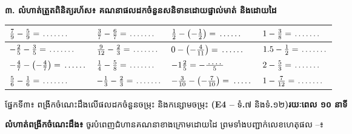\documentclass[a4paper,10pt]{article}
\newcommand{\enbf}[1]{{\TimesEn\bfseries #1}}
\newcommand{\cnum}[1]{\mbox{\fontsize{10pt}{12pt}\selectfont\ding{\numexpr181+#1\relax}}}
\newcommand{\blank}[1][1.5cm]{\makebox[#1]{\dotfill}}
\newcommand{\secbar}[2]{%
  \begin{tcolorbox}[enhanced, sharp corners, colback=headgray, colframe=black, boxrule=0.9pt, boxsep=1pt, top=2pt, bottom=2pt, left=5pt, right=5pt, before skip=4pt, after skip=3pt]
    {\muol\fontsize{9.2pt}{13pt}\selectfont #1}\hfill{\fontsize{8pt}{11pt}\selectfont\textbf{#2}}
  \end{tcolorbox}%
}
\begin{document}
\vspace{5pt}
\textbf{៣. លំហាត់ត្រួតពិនិត្យរហ័ស៖ គណនាផលដកចំនួនសនិទានដោយផ្ទាល់មាត់ និងដោយដៃ}

\vspace{3pt}
{\renewcommand{\arraystretch}{1.70}
\begin{tabular}{|C{4.40cm}|C{4.40cm}|C{4.40cm}|C{4.40cm}|}
  \hline
  $\frac{7}{9} - \frac{5}{9} = \blank[1.1cm]$ & $\frac{3}{7} - \frac{6}{7} = \blank[1.1cm]$ & $\frac{1}{2} - \left(-\frac{1}{2}\right) = \blank[1.0cm]$ & $1 - \frac{3}{8} = \blank[1.1cm]$ \\
  \hline
  $-\frac{2}{5} - \frac{3}{5} = \blank[1.1cm]$ & $\frac{9}{12} - \frac{2}{3} = \blank[1.1cm]$ & $0 - \left(-\frac{4}{11}\right) = \blank[1.0cm]$ & $1.5 - \frac{1}{2} = \blank[1.1cm]$ \\
  \hline
  $-\frac{4}{7} - \left(-\frac{4}{7}\right) = \blank[1.0cm]$ & $\frac{1}{4} - \frac{5}{8} = \blank[1.1cm]$ & $-1\frac{2}{5} = -\frac{\blank[0.7cm]}{5}$ & $2 - \frac{5}{3} = \blank[1.1cm]$ \\
  \hline
  $\frac{5}{6} - \frac{1}{6} = \blank[1.1cm]$ & $-\frac{1}{3} - \frac{2}{3} = \blank[1.1cm]$ & $-\frac{3}{10} - \left(-\frac{7}{10}\right) = \blank[0.9cm]$ & $1 - \frac{7}{12} = \blank[1.1cm]$ \\
  \hline
\end{tabular}}

\newpage

\secbar{ផ្នែកទី៣៖ ពង្រីកចំណេះដឹងលើផលដកចំនួនចម្រុះ និងកន្សោមចម្រុះ \enbf{(E4 --} ទំ\enbf{.}៧ និងទំ\enbf{.}១២\enbf{)}}{រយៈពេល ១០ នាទី}

\textbf{លំហាត់ពង្រីកចំណេះដឹង៖} ចូរបំពេញជំហានគណនាខាងក្រោមដោយដៃ ព្រមទាំងបញ្ជាក់លេខហេតុផល \cnum{1}--\cnum{5}៖
\end{document}
